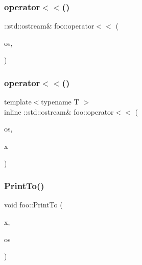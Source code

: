 \subsubsection{\texorpdfstring{operator$<$$<$()}{operator<<()}\hspace{0.1cm}{\footnotesize\ttfamily [1/2]}}
{\footnotesize\ttfamily \+::std\+::ostream\& foo\+::operator$<$$<$ (\begin{DoxyParamCaption}\item[{\+::std\+::ostream \&}]{os,  }\item[{const \mbox{\hyperlink{structfoo_1_1PointerPrintable}{Pointer\+Printable}} $\ast$}]{ }\end{DoxyParamCaption})}

\mbox{\label{namespacefoo_abe04f604d114085b0b9af25600ef00da}} 
\subsubsection{\texorpdfstring{operator$<$$<$()}{operator<<()}\hspace{0.1cm}{\footnotesize\ttfamily [2/2]}}
{\footnotesize\ttfamily template$<$typename T $>$ \\
inline \+::std\+::ostream\& foo\+::operator$<$$<$ (\begin{DoxyParamCaption}\item[{\+::std\+::ostream \&}]{os,  }\item[{const \mbox{\hyperlink{classfoo_1_1StreamableTemplateInFoo}{Streamable\+Template\+In\+Foo}}$<$ T $>$ \&}]{x }\end{DoxyParamCaption})}

\mbox{\label{namespacefoo_ac435de653934c97045bbdba8c8afbe3f}} 
\subsubsection{\texorpdfstring{PrintTo()}{PrintTo()}\hspace{0.1cm}{\footnotesize\ttfamily [1/2]}}
{\footnotesize\ttfamily void foo\+::\+Print\+To (\begin{DoxyParamCaption}\item[{const \mbox{\hyperlink{structfoo_1_1PrintableViaPrintTo}{Printable\+Via\+Print\+To}} \&}]{x,  }\item[{\+::std\+::ostream $\ast$}]{os }\end{DoxyParamCaption})}

